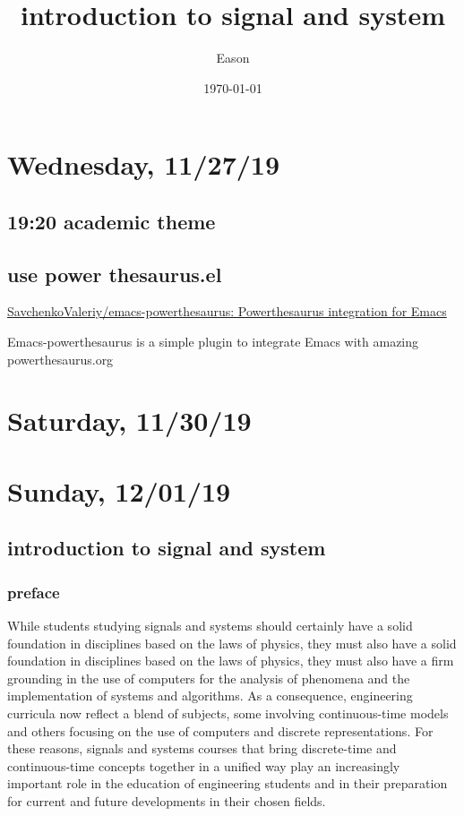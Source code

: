 \documentclass[koma,utopia,letterpaper,captions=tableheading,11pt,listings-sv,microtype,paralist,colorlinks=true,urlcolor=blue]{org-article}
\author{Eason}
\date{\today}
\title{introduction to signal and system}
\begin{document}
\maketitle
\tableofcontents

\section{Wednesday, 11/27/19}
\label{sec:org7ec480d}
\subsection{19:20 academic theme}
\label{sec:orgc626325}
\subsection{use power thesaurus.el}
\label{sec:orgd065b2d}


\href{https://github.com/SavchenkoValeriy/emacs-powerthesaurus}{SavchenkoValeriy/emacs-powerthesaurus: Powerthesaurus integration for Emacs}

Emacs-powerthesaurus is a simple plugin to integrate Emacs with amazing
powerthesaurus.org



\section{Saturday, 11/30/19}
\label{sec:org5c14c91}

\section{Sunday, 12/01/19}
\label{sec:org4ace420}
\subsection{introduction to signal and system}
\label{sec:orgabba3dd}
\subsubsection{preface}
\label{sec:org8b47609}


While students studying signals and systems should certainly have a solid
foundation in disciplines based on the laws of physics, they must also have a
solid foundation in disciplines based on the laws of physics, they must also
have a firm grounding in the use of computers for the analysis of phenomena
and the implementation of systems and algorithms. As a consequence, engineering
curricula now reflect a blend of subjects, some involving continuous-time models
and others focusing on the use of computers and discrete representations. For
these reasons, signals and systems courses that bring discrete-time and
continuous-time concepts together in a unified way play an increasingly
important role in the education of engineering students and in their preparation
for current and future developments in their chosen fields.
\end{document}
